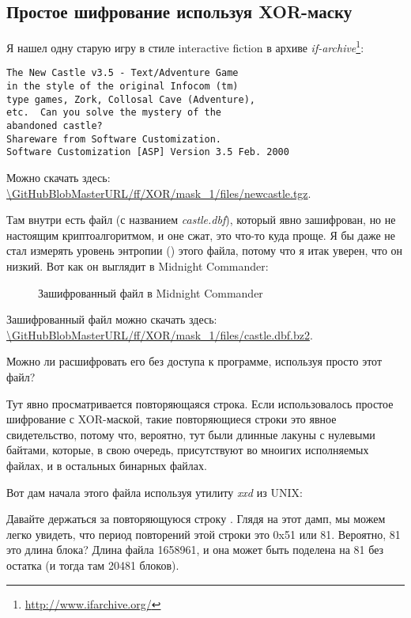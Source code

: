 \subsection{Простое шифрование используя XOR-маску}
\label{XOR_mask_1}

Я нашел одну старую игру в стиле interactive fiction в архиве \emph{if-archive}\footnote{\url{http://www.ifarchive.org/}}:

\begin{lstlisting}
The New Castle v3.5 - Text/Adventure Game
in the style of the original Infocom (tm)
type games, Zork, Collosal Cave (Adventure),
etc.  Can you solve the mystery of the
abandoned castle?
Shareware from Software Customization.
Software Customization [ASP] Version 3.5 Feb. 2000
\end{lstlisting}

Можно скачать здесь: \url{\GitHubBlobMasterURL/ff/XOR/mask_1/files/newcastle.tgz}.

Там внутри есть файл (с названием \emph{castle.dbf}), который явно зашифрован, но не настоящим криптоалгоритмом,
и оне сжат, это что-то куда проще.
Я бы даже не стал измерять уровень энтропии () этого файла, потому что я итак уверен, что он низкий.
Вот как он выглядит в Midnight Commander:

\begin{figure}[H]
\centering
{}
\caption{Зашифрованный файл в Midnight Commander}
\end{figure}

Зашифрованный файл можно скачать здесь:
\url{\GitHubBlobMasterURL/ff/XOR/mask_1/files/castle.dbf.bz2}.

Можно ли расшифровать его без доступа к программе, используя просто этот файл?

Тут явно просматривается повторяющаяся строка. 
Если использовалось простое шифрование с XOR-маской, такие повторяющиеся строки это явное свидетельство,
потому что, вероятно, тут были длинные лакуны с нулевыми байтами, которые, в свою очередь, присутствуют
во мноигих исполняемых файлах, и в остальных бинарных файлах.

Вот дам начала этого файла используя утилиту \emph{xxd} из UNIX:



Давайте держаться за повторяющуюся строку .
Глядя на этот дамп, мы можем легко увидеть, что период повторений этой строки это 0x51 или 81.
Вероятно, 81 это длина блока?
Длина файла 1658961, и она может быть поделена на 81 без остатка (и тогда там 20481 блоков).

